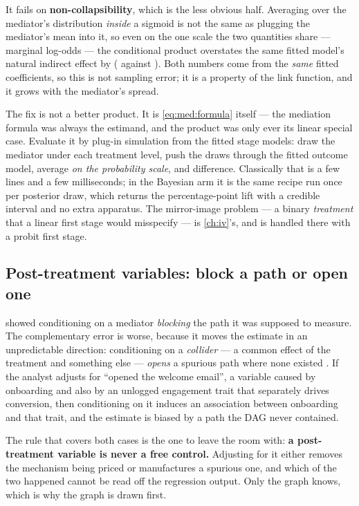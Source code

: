 It fails on \textbf{non-collapsibility}, which is the less obvious half. Averaging over the mediator's
distribution \emph{inside} a sigmoid is not the same as plugging the mediator's mean into it, so even
on the one scale the two quantities share --- marginal log-odds --- the conditional product
overstates the same fitted model's natural indirect effect by \pc{\nbFourBinOverstatePct}
(\nbFourBinAbLogodds{} against \nbFourBinNieLogodds). Both numbers come from the \emph{same} fitted
coefficients, so this is not sampling error; it is a property of the link function, and it grows with
the mediator's spread.



The fix is not a better product. It is \cref{eq:med:formula} itself --- the mediation formula was
always the estimand, and the product was only ever its linear special case. Evaluate it by plug-in
simulation from the fitted stage models: draw the mediator under each treatment level, push the draws
through the fitted outcome model, average \emph{on the probability scale}, and difference. Classically
that is a few lines and a few milliseconds; in the Bayesian arm it is the same recipe run once per
posterior draw, which returns the percentage-point lift with a credible interval and no extra
apparatus. The mirror-image problem --- a binary \emph{treatment} that a linear first stage would
misspecify --- is \cref{ch:iv}'s, and is handled there with a probit first stage.

\subsection*{Post-treatment variables: block a path or open one}

 showed conditioning on a mediator \emph{blocking} the path it was supposed
to measure. The complementary error is worse, because it moves the estimate in an unpredictable
direction: conditioning on a \emph{collider} --- a common effect of the treatment and something else
--- \emph{opens} a spurious path where none existed \citep{pearl2009, cole2002}. If the analyst
adjusts for ``opened the welcome email'', a variable caused by onboarding and also by an unlogged
engagement trait that separately drives conversion, then conditioning on it induces an association
between onboarding and that trait, and the estimate is biased by a path the DAG never contained.

The rule that covers both cases is the one to leave the room with: \textbf{a post-treatment variable
is never a free control.} Adjusting for it either removes the mechanism being priced or manufactures
a spurious one, and which of the two happened cannot be read off the regression output. Only the
graph knows, which is why the graph is drawn first.

